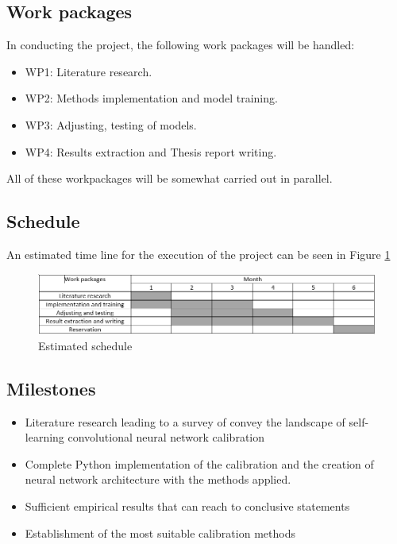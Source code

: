 \documentclass[a4paper]{article}
\begin{document}
\subsection{Work packages}
In conducting the project, the following work packages will be handled:
\begin{itemize}
	
\item WP1: Literature research.
\item WP2: Methods implementation and model training.
\item WP3: Adjusting, testing of models.
\item WP4: Results extraction and Thesis report writing.
	
\end{itemize} 
All of these workpackages will be somewhat carried out in parallel.
\subsection{Schedule}
An estimated time line for the execution of the project can be seen in Figure \ref{fig:schedule}
\begin{figure}
\includegraphics[width=1\textwidth]{gant.png}
\caption{Estimated schedule}
\label{fig:schedule}
\end{figure}

\subsection{Milestones}
\begin{itemize}
	\item Literature research leading to a survey of convey the landscape of self-learning convolutional neural network calibration
	\item Complete Python implementation of the calibration and the creation of neural network architecture with the methods applied.
	\item Sufficient empirical results that can reach to conclusive statements
	\item Establishment of the most suitable calibration methods
\end{itemize}
\end{document}
